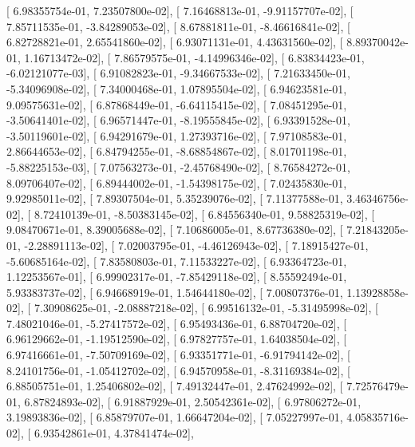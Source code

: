 \documentclass{article}
\begin{document}
       [  6.98355754e-01,   7.23507800e-02],
       [  7.16468813e-01,  -9.91157707e-02],
       [  7.85711535e-01,  -3.84289053e-02],
       [  8.67881811e-01,  -8.46616841e-02],
       [  6.82728821e-01,   2.65541860e-02],
       [  6.93071131e-01,   4.43631560e-02],
       [  8.89370042e-01,   1.16713472e-02],
       [  7.86579575e-01,  -4.14996346e-02],
       [  6.83834423e-01,  -6.02121077e-03],
       [  6.91082823e-01,  -9.34667533e-02],
       [  7.21633450e-01,  -5.34096908e-02],
       [  7.34000468e-01,   1.07895504e-02],
       [  6.94623581e-01,   9.09575631e-02],
       [  6.87868449e-01,  -6.64115415e-02],
       [  7.08451295e-01,  -3.50641401e-02],
       [  6.96571447e-01,  -8.19555845e-02],
       [  6.93391528e-01,  -3.50119601e-02],
       [  6.94291679e-01,   1.27393716e-02],
       [  7.97108583e-01,   2.86644653e-02],
       [  6.84794255e-01,  -8.68854867e-02],
       [  8.01701198e-01,  -5.88225153e-03],
       [  7.07563273e-01,  -2.45768490e-02],
       [  8.76584272e-01,   8.09706407e-02],
       [  6.89444002e-01,  -1.54398175e-02],
       [  7.02435830e-01,   9.92985011e-02],
       [  7.89307504e-01,   5.35239076e-02],
       [  7.11377588e-01,   3.46346756e-02],
       [  8.72410139e-01,  -8.50383145e-02],
       [  6.84556340e-01,   9.58825319e-02],
       [  9.08470671e-01,   8.39005688e-02],
       [  7.10686005e-01,   8.67736380e-02],
       [  7.21843205e-01,  -2.28891113e-02],
       [  7.02003795e-01,  -4.46126943e-02],
       [  7.18915427e-01,  -5.60685164e-02],
       [  7.83580803e-01,   7.11533227e-02],
       [  6.93364723e-01,   1.12253567e-01],
       [  6.99902317e-01,  -7.85429118e-02],
       [  8.55592494e-01,   5.93383737e-02],
       [  6.94668919e-01,   1.54644180e-02],
       [  7.00807376e-01,   1.13928858e-02],
       [  7.30908625e-01,  -2.08887218e-02],
       [  6.99516132e-01,  -5.31495998e-02],
       [  7.48021046e-01,  -5.27417572e-02],
       [  6.95493436e-01,   6.88704720e-02],
       [  6.96129662e-01,  -1.19512590e-02],
       [  6.97827757e-01,   1.64038504e-02],
       [  6.97416661e-01,  -7.50709169e-02],
       [  6.93351771e-01,  -6.91794142e-02],
       [  8.24101756e-01,  -1.05412702e-02],
       [  6.94570958e-01,  -8.31169384e-02],
       [  6.88505751e-01,   1.25406802e-02],
       [  7.49132447e-01,   2.47624992e-02],
       [  7.72576479e-01,   6.87824893e-02],
       [  6.91887929e-01,   2.50542361e-02],
       [  6.97806272e-01,   3.19893836e-02],
       [  6.85879707e-01,   1.66647204e-02],
       [  7.05227997e-01,   4.05835716e-02],
       [  6.93542861e-01,   4.37841474e-02],
\end{document}
